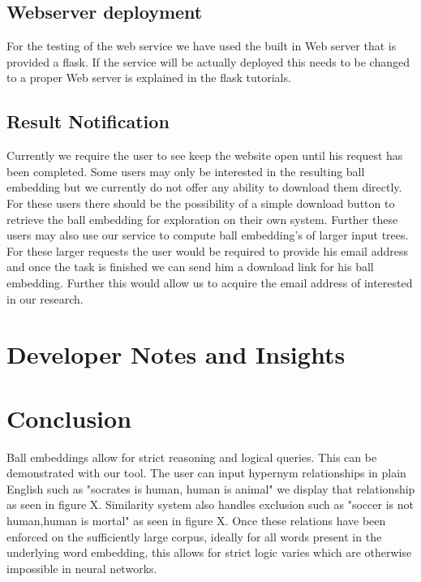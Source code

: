 \documentclass[]{article}
\begin{document}
\subsection{Webserver deployment}
For the testing of the web service we have used the built in Web server that is provided a flask. If the service will be actually deployed this needs to be changed to a proper Web server is explained in the flask tutorials.
\subsection{Result Notification}
Currently we require the user to see keep the website open until his request has been completed. Some users may only be interested in the resulting ball embedding but we currently do not offer any ability to download them directly. For these users there should be the possibility of a simple download button to retrieve the ball embedding for exploration on their own system. Further these users may also use our service to compute ball embedding's of larger input trees. For these larger requests the user would be required to provide his email address and once the task is finished we can send him a download link for his ball embedding. Further this would allow us to acquire the email address of interested in our research.


\section{Developer Notes and Insights}
\section{Conclusion}
Ball embeddings allow for strict reasoning and logical queries. This can be demonstrated with our tool. The user can input hypernym relationships in plain English such as "socrates is human, human is animal" we display that relationship as seen in figure X. Similarity system also handles exclusion such as "soccer is not human,human is mortal" as seen in figure X. Once these relations have been enforced on the sufficiently large corpus, ideally for all words present in the underlying word embedding, this allows for strict logic varies which are otherwise impossible in neural networks.
\end{document}
